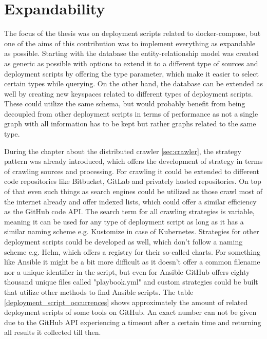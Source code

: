 \section{Expandability}
\label{sec:expandability}
The focus of the thesis was on deployment scripts related to docker-compose, but one of the aims of this contribution was to implement everything as expandable as possible.
Starting with the database the entity-relationship model was created as generic as possible with options to extend it to a different type of sources and deployment scripts by offering the type parameter, which make it easier to select certain types while querying. On the other hand, the database can be extended as well by creating new keyspaces related to different types of deployment scripts. These could utilize the same schema, but would probably benefit from being decoupled from other deployment scripts in terms of performance as not a single graph with all information has to be kept but rather graphs related to the same type.

During the chapter about the distributed crawler \ref{sec:crawler}, the strategy pattern was already introduced, which offers the development of strategy in terms of crawling sources and processing.
For crawling it could be extended to different code repositories like Bitbucket, GitLab and privately hosted repositories. On top of that even such things as search engines could be utilized as those crawl most of the internet already and offer indexed lists, which could offer a similar efficiency as the GitHub code API. The search term for all crawling strategies is variable, meaning it can be used for any type of deployment script as long as it has a similar naming scheme e.g. Kustomize in case of Kubernetes. Strategies for other deployment scripts could be developed as well, which don't follow a naming scheme e.g. Helm, which offers a registry for their so-called charts. For something like Ansible it might be a bit more difficult as it doesn't offer a common filename nor a unique identifier in the script, but even for Ansible GitHub offers eighty thousand unique files called "playbook.yml" and custom strategies could be built that utilize other methods to find Ansible scripts. The table \ref{deployment_script_occurrences} shows approximately the amount of related deployment scripts of some tools on GitHub. An exact number can not be given due to the GitHub API experiencing a timeout after a certain time and returning all results it collected till then.

